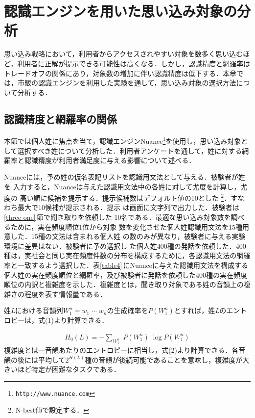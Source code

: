\section{認識エンジンを用いた思い込み対象の分析}
\label{four}
思い込み戦略において，利用者からアクセスされやすい対象を数多く思い込むほど，利用者に正解が提示できる可能性は高くなる．しかし，認識精度と網羅率はトレードオフの関係にあり，対象数の増加に伴い認識精度は低下する．本章では，市販の認識エンジンを利用した実験を通して，思い込み対象の選択方法について分析する．

\subsection{認識精度と網羅率の関係}
\label{four-one}
本節では個人姓に焦点を当て，認識エンジンNuance\footnote{\tt{http://www.nuance.com}}を使用し，思い込み対象として選択すべき姓について分析した．利用者アンケートを通して，姓に対する網羅率と認識精度が利用者満足度に与える影響について述べる．

Nuanceには，予め姓の仮名表記リストを認識用文法として与える．被験者が姓を
入力すると，Nuanceは与えた認識用文法中の各姓に対して尤度を計算し，尤度の
高い順に候補を提示する．提示候補数はデフォルト値の10とした
\footnote{N-best値で設定する．}．すなわち最大で10候補が提示される．提示
は画面に文字列で出力した．被験者は\ref{three-one}\,節で聞き取りを依頼した
10名である．最適な思い込み対象数を調べるために，実在頻度順位1位から対象
数を変化させた個人姓認識用文法を15種用意した．15種の文法は含まれる個人姓
の数のみが異なり，被験者に与える実験環境に差異はない．被験者に予め選択し
た個人姓400種の発話を依頼した．400種は，実社会と同じ実在頻度件数の分布を構成するために，各認識用文法の網羅率と一致するよう選択した．表\ref{table4}\,にNuanceに与えた認識用文法を構成する個人姓の実在頻度順位と網羅率\cite{name}，及び被験者に発話を依頼した400種の実在頻度順位の内訳と複雑度を示した．複雑度とは，聞き取り対象である姓の音韻上の複雑さの程度を表す情報量である．

姓{\em L}における音韻列$W_{1}^{n} = w_{1}\;\cdots\;w_{n}$の生成確率を$P(W_{1}^{n})$とすれば，姓{\em L}のエントロピーは，式(1)より計算できる\cite{Kita1999}．

\begin{eqnarray}
H_{0}(L) = -\sum_{W_{1}^{n}}\;P(W_{1}^{n})\;\log P(W_{1}^{n})
\end{eqnarray}
複雑度とは一音韻あたりのエントロピーに相当し，式(2)より計算できる．各音韻の後には平均して$2^{H(L)}$種の音韻が後続可能であることを意味し，複雑度が大きいほど特定が困難なタスクである．

